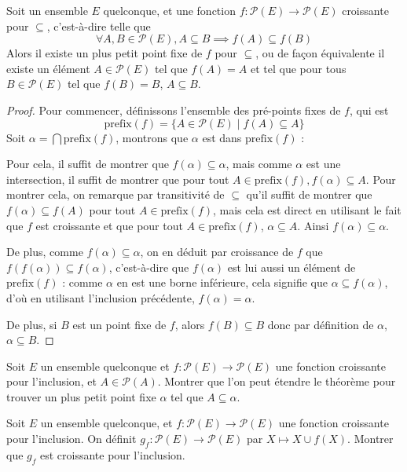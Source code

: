 \begin{theorem}
  Soit un ensemble $E$ quelconque, et une fonction
  $f : \mathcal P(E) \to \mathcal P(E)$ croissante pour $\subseteq$,
  c'est-à-dire telle que
  $$\forall A,B\in\mathcal P(E), A\subseteq B \implies f(A)\subseteq f(B)$$
  Alors il existe un plus petit point fixe de $f$ pour $\subseteq$, ou de façon
  équivalente il existe un élément $A\in \mathcal P(E)$ tel que $f(A)=A$ et tel
  que pour tous $B\in\mathcal P(E)$ tel que $f(B)=B$, $A\subseteq B$.
\end{theorem}
\begin{proof}
  Pour commencer, définissons l'ensemble des pré-points fixes de $f$, qui est
  $$\mathrm{prefix}(f) = \{ A \in \mathcal P(E)\mid f(A)\subseteq A\}$$
  Soit $\alpha = \bigcap \mathrm{prefix}(f)$, montrons que $\alpha$ est dans
  $\mathrm{prefix}(f)$ :

  Pour cela, il suffit de montrer que $f(\alpha)\subseteq \alpha$, mais comme
  $\alpha$ est une intersection, il suffit de montrer que pour tout
  $A\in\mathrm{prefix}(f), f(\alpha)\subseteq A$. Pour montrer cela, on
  remarque par transitivité de $\subseteq$ qu'il suffit de montrer que
  $f(\alpha)\subseteq f(A)$ pour tout $A\in \mathrm{prefix}(f)$, mais cela est
  direct en utilisant le fait que $f$ est croissante et que pour tout
  $A\in \mathrm{prefix}(f)$, $\alpha \subseteq A$. Ainsi
  $f(\alpha)\subseteq \alpha$.

  De plus, comme $f(\alpha)\subseteq \alpha$, on en déduit par croissance de
  $f$ que $f(f(\alpha))\subseteq f(\alpha)$, c'est-à-dire que $f(\alpha)$ est
  lui aussi un élément de $\mathrm{prefix}(f)$ : comme $\alpha$ en est une
  borne inférieure, cela signifie que $\alpha \subseteq f(\alpha)$, d'où en
  utilisant l'inclusion précédente, $f(\alpha) = \alpha$.

  De plus, si $B$ est un point fixe de $f$, alors $f(B)\subseteq B$ donc par
  définition de $\alpha$, $\alpha \subseteq B$.
\end{proof}

\begin{exercise}
  Soit $E$ un ensemble quelconque et $f : \mathcal P(E) \to \mathcal P(E)$ une
  fonction croissante pour l'inclusion, et $A \in \mathcal P(A)$. Montrer que
  l'on peut étendre le théorème pour trouver un plus petit point fixe $\alpha$
  tel que $A\subseteq \alpha$.
\end{exercise}

\begin{exercise}
  Soit $E$ un ensemble quelconque, et $f : \mathcal P(E) \to \mathcal P(E)$ une
  fonction croissante pour l'inclusion. On définit
  $g_f : \mathcal P(E) \to \mathcal P(E)$ par $X \mapsto X \cup f(X)$. Montrer
  que $g_f$ est croissante pour l'inclusion.
\end{exercise}

